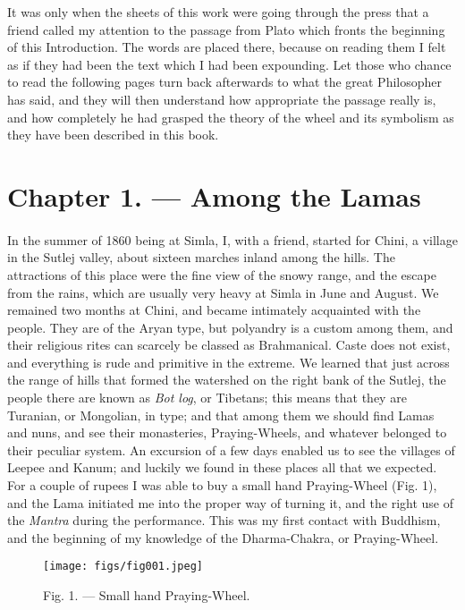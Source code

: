 \documentclass[a4paper, 11pt, oneside, polutonikogreek, english]{article}
\begin{document}
It was only when the sheets of this work were going through the press that a friend called my attention to the passage from Plato which fronts the beginning of this Introduction. The words are placed there, because on reading them I felt as if they had been the text which I had been expounding. Let those who chance to read the following pages turn back afterwards to what the great Philosopher has said, and they will then understand how appropriate the passage really is, and how completely he had grasped the theory of the wheel and its symbolism as they have been described in this book.
\clearpage
\section{Chapter 1. --- Among the Lamas}
\paragraph{}
In the summer of 1860 being at Simla, I, with a friend, started for Chini, a village in the Sutlej valley, about sixteen marches inland among the hills. The attractions of this place were the fine view of the snowy range, and the escape from the rains, which are usually very heavy at Simla in June and August. We remained two months at Chini, and became intimately acquainted with the people. They are of the Aryan type, but polyandry is a custom among them, and their religious rites can scarcely be classed as Brahmanical. Caste does not exist, and everything is rude and primitive in the extreme. We learned that just across the range of hills that formed the watershed on the right bank of the Sutlej, the people there are known as \emph{Bot log}, or Tibetans; this means that they are Turanian, or Mongolian, in type; and that among them we should find Lamas and nuns, and see their monasteries, Praying-Wheels, and whatever belonged to their peculiar system. An excursion of a few days enabled us to see the villages of Leepee and Kanum; and luckily we found in these places all that we expected. For a couple of rupees I was able to buy a small hand Praying-Wheel (Fig. 1), and the Lama initiated me into the proper way of turning it, and the right use of the \emph{Mantra} during the performance. This was my first contact with Buddhism, and the beginning of my knowledge of the Dharma-Chakra, or Praying-Wheel.

\begin{figure}[H]
\centering
\texttt{[image: figs/fig001.jpeg]}
\caption{Fig. 1. --- Small hand Praying-Wheel.}
\end{figure}
\end{document}
